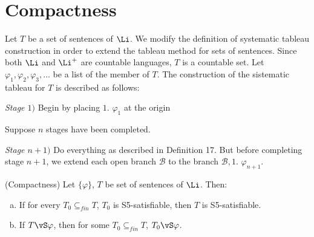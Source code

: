\section{Compactness}


\begin{defn}
Let $T$ be a set of sentences of $\Li$. We modify the definition of systematic tableau construction in order to extend the tableau method for sets of sentences. Since both $\Li$ and $\Li^{+}$ are countable languages, $T$ is a countable set. Let $\varphi_1, \varphi_2, \varphi_3, \dots$ be a list of the member of $T$. The construction of the sistematic tableau for $T$ is described as follows:

\qquad \textit{Stage $1)$} Begin by placing $1.$ $\varphi_{1}$ at the origin

\qquad Suppose $n$ stages have been completed.

\qquad \textit{Stage $n+1)$} Do everything as described in Definition 17. But before completing stage $n+1$, we extend each open branch $\mathcal{B}$ to the branch $\mathcal{B}, 1.$ $\varphi_{n+1}$. 

\end{defn}

\begin{teor}
(Compactness) Let $\{\varphi\}$, $T$ be set of sentences of $\Li$. Then:
\begin{enumerate}[(a)]
\item If for every $T_{0} \subseteq_{fin} T$, $T_{0}$ is S5-satisfiable, then $T$ is S5-satisfiable.
\item If $T\vS \varphi$, then for some $T_{0} \subseteq_{fin} T$, $T_{0}\vS \varphi$.
\end{enumerate}
\end{teor}

